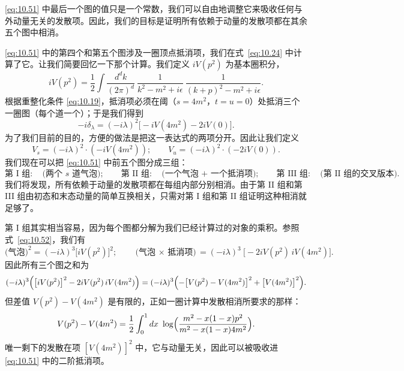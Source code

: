 \eqref{eq:10.51} 中最后一个图的值只是一个常数，我们可以自由地调整它来吸收任何与外动量无关的发散项。因此，我们的目标是证明所有依赖于动量的发散项都在其余五个图中相消。

\eqref{eq:10.51} 中的第四个和第五个图涉及一圈顶点抵消项，我们在式~\eqref{eq:10.24} 中计算了它。让我们简要回忆一下那个计算。我们定义 $iV(p^2)$ 为基本圈积分，
\begin{equation}
  iV(p^2) = \frac{1}{2}\int \frac{d^dk}{(2\pi)^d}\ \frac{1}{k^2-m^2+i\epsilon}\
    \frac{1}{(k+p)^2-m^2+i\epsilon} .
  \label{eq:10.52}
\end{equation}
根据重整化条件 \eqref{eq:10.19}，抵消项必须在阈（$s = 4m^2$，$t = u = 0$）处抵消三个一圈图（每个道一个）；于是我们得到
\begin{equation}
  -i\delta_\lambda = (-i\lambda)^2\bigl[ -iV(4m^2) - 2iV(0) \bigr] .
\end{equation}
为了我们目前的目的，方便的做法是把这一表达式的两项分开。因此让我们定义
\begin{equation}
  V_s = (-i\lambda)^2\cdot(-iV(4m^2));\qquad
  V_u = (-i\lambda)^2\cdot(-2iV(0)) .
\end{equation}
我们现在可以把 \eqref{eq:10.51} 中前五个图分成三组：
\begin{equation}
  \text{第 I 组}:\quad \text{(两个 } s\text{ 道气泡)};\qquad
  \text{第 II 组}:\quad \text{(一个气泡 + 一个抵消项)};\qquad
  \text{第 III 组}:\quad \text{(第 II 组的交叉版本)} .
\end{equation}
我们将发现，所有依赖于动量的发散项都在每组内部分别相消。由于第 II 组和第 III 组由初态和末态动量的简单互换相关，只需对第 I 组和第 II 组证明这种相消就足够了。

第 I 组其实相当容易，因为每个图都分解为我们已经计算过的对象的乘积。参照式~\eqref{eq:10.52}，我们有
\begin{equation}
  \text{(气泡)}^2 = (-i\lambda)^3\bigl[ iV(p^2) \bigr]^2;
  \qquad \text{(气泡 $\times$ 抵消项)} = (-i\lambda)^3\
    \bigl[ -2iV(p^2)\,iV(4m^2) \bigr] .
\end{equation}
因此所有三个图之和为
\begin{equation}
  (-i\lambda)^3\Bigl( \bigl[ iV(p^2) \bigr]^2 - 2iV(p^2)\,iV(4m^2)
    \Bigr)
  = (-i\lambda)^3\Bigl( -\bigl[ V(p^2) - V(4m^2) \bigr]^2
    + \bigl[ V(4m^2) \bigr]^2 \Bigr) .
  \label{eq:10.53}
\end{equation}
但差值 $V(p^2) - V(4m^2)$ 是有限的，正如一圈计算中发散相消所要求的那样：
\begin{equation}
  V(p^2) - V(4m^2) = \frac{1}{2}\int_0^1 dx\ \log\Bigl(
    \frac{m^2 - x(1-x)p^2}{m^2 - x(1-x)4m^2} \Bigr) .
\end{equation}
唯一剩下的发散在项 $[V(4m^2)]^2$ 中，它与动量无关，因此可以被吸收进 \eqref{eq:10.51} 中的二阶抵消项。

